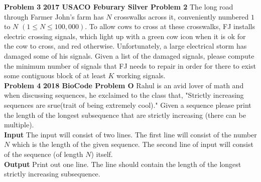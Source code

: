 \documentclass[11pt]{article}
\begin{document}
\textbf{Problem 3} \textbf{2017 USACO Feburary Silver Problem 2}
    The long road through Farmer John's farm has $N$ crosswalks across it, conveniently numbered $1$ to $N$ $(1 \leq N \leq 100,000)$. To allow cows to cross at these crosswalks, FJ installs electric crossing signals, which light up with a green cow icon when it is ok for the cow to cross, and red otherwise. Unfortunately, a large electrical storm has damaged some of his signals. Given a list of the damaged signals, please compute the minimum number of signals that FJ needs to repair in order for there to exist some contiguous block of at least $K$ working signals.\\
    
\textbf{Problem 4} \textbf{2018 BioCode Problem O}
    Rahul is an avid lover of math and when discussing sequences, he exclaimed to the class that, "Strictly increasing sequences are srue(trait of being extremely cool)." Given a sequence please print the length of the longest subsequence that are strictly increasing (there can be multiple). \\ \textbf{Input} The input will consist of two lines. The first line will consist of the number $N$ which is the length of the given sequence. The second line of input will consist of the sequence (of length $N$) itself. \\ \textbf{Output} Print out one line. The line should contain the length of the longest strictly increasing subsequence. \\
\end{document}
